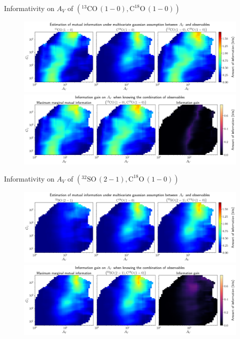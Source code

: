\documentclass{beamer}
\begin{document}
\begin{frame}{Informativity on $A_V$ of $\left(\mathrm{^{13}CO\,(1-0)},\mathrm{C^{18}O\,(1-0)}\right)$}
    \begin{figure}
        \centering
        \includegraphics[width=0.95\linewidth]{../linearinfo/av__13co10_c18o10_linearinfo.png}
        \vfill
        \includegraphics[width=0.95\linewidth]{../linearinfo/av__13co10_c18o10_linearinfo_gain.png}
    \end{figure}
\end{frame}

\begin{frame}{Informativity on $A_V$ of $\left(\mathrm{^{32}SO\,(2-1)},\mathrm{C^{18}O\,(1-0)}\right)$}
    \begin{figure}
        \centering
        \includegraphics[width=0.95\linewidth]{../linearinfo/av__32so21_c18o10_linearinfo.png}
        \vfill
        \includegraphics[width=0.95\linewidth]{../linearinfo/av__32so21_c18o10_linearinfo_gain.png}
    \end{figure}
\end{frame}
\end{document}
